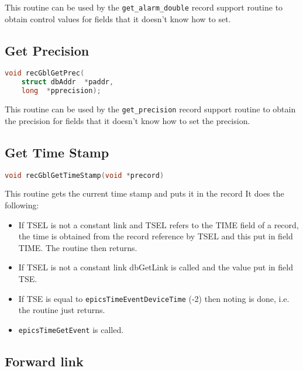 This routine can be used by the \verb|get_alarm_double| record support routine to obtain control values for fields that it 
doesn't know how to set.

\subsection{Get Precision}

\begin{lstlisting}[language=C]
void recGblGetPrec(
    struct dbAddr  *paddr,
    long  *pprecision);
\end{lstlisting}

This routine can be used by the \verb|get_precision| record support routine to obtain the precision for fields that it doesn't 
know how to set the precision.

\subsection{Get Time Stamp}

\begin{lstlisting}[language=C]
void recGblGetTimeStamp(void *precord)
\end{lstlisting}

This routine gets the current time stamp and puts it in the record It does the following:

\begin{itemize}
\item If TSEL is not a constant link and TSEL refers to the TIME field of a record, the time is obtained from the record reference by TSEL and this put in field TIME.
The routine then returns.

\item If TSEL is not a constant link dbGetLink is called and the value put in field TSE.

\item If TSE is equal to \verb|epicsTimeEventDeviceTime| (-2) then noting is done, i.e. the routine just returns.

\item \verb|epicsTimeGetEvent| is called.

\end{itemize}

\subsection{Forward link}


